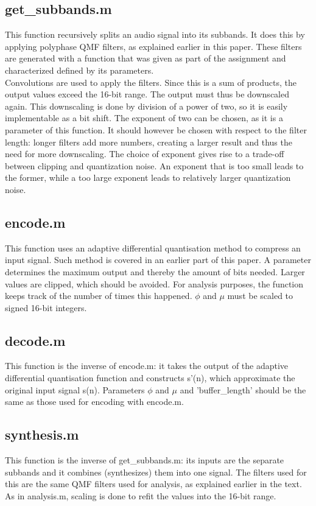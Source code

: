 \documentclass[a4paper]{article}
\begin{document}
\subsection{get\_subbands.m}
This function recursively splits an audio signal into its subbands. It does this by applying polyphase QMF filters, as explained earlier in this paper. These filters are generated with a function that was given as part of the assignment and characterized defined by its parameters.\\
Convolutions are used to apply the filters. Since this is a sum of products, the output values exceed the 16-bit range. The output must thus be downscaled again. This downscaling is done by division of a power of two, so it is easily implementable as a bit shift. The exponent of two can be chosen, as it is a parameter of this function. It should however be chosen with respect to the filter length: longer filters add more numbers, creating a larger result and thus the need for more downscaling. The choice of exponent gives rise to a trade-off between clipping and quantization noise. An exponent that is too small leads to the former, while a too large exponent leads to relatively larger quantization noise.

\subsection{encode.m}
This function uses an adaptive differential quantisation method to compress an input signal. Such method is covered in an earlier part of this paper. A parameter determines the maximum output and thereby the amount of bits needed. Larger values are clipped, which should be avoided. For analysis purposes, the function keeps track of the number of times this happened. $\phi$ and $\mu$ must be scaled to signed 16-bit integers.

\subsection{decode.m}
This function is the inverse of encode.m: it takes the output of the adaptive differential quantisation function and constructs s'(n), which approximate the original input signal s(n). Parameters $\phi$ and $\mu$ and 'buffer\_length' should be the same as those used for encoding with encode.m.


\subsection{synthesis.m}
This function is the inverse of get\_subbands.m: its inputs are the separate subbands and it combines (synthesizes) them into one signal. The filters used for this are the same QMF filters used for analysis, as explained earlier in the text. As in analysis.m, scaling is done to refit the values into the 16-bit range.
\end{document}
